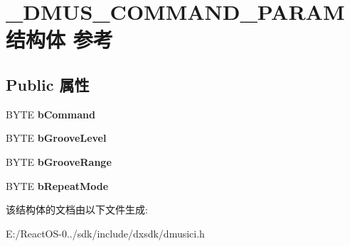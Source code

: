 \hypertarget{struct___d_m_u_s___c_o_m_m_a_n_d___p_a_r_a_m}{}\section{\+\_\+\+D\+M\+U\+S\+\_\+\+C\+O\+M\+M\+A\+N\+D\+\_\+\+P\+A\+R\+A\+M结构体 参考}
\label{struct___d_m_u_s___c_o_m_m_a_n_d___p_a_r_a_m}
\subsection*{Public 属性}
\begin{DoxyCompactItemize}
\item 
\mbox{\label{struct___d_m_u_s___c_o_m_m_a_n_d___p_a_r_a_m_a2c8ffa2fc37414b8b110d7c9f54c3c97}} 
B\+Y\+TE {\bfseries b\+Command}
\item 
\mbox{\label{struct___d_m_u_s___c_o_m_m_a_n_d___p_a_r_a_m_a9e98a052b4fb2d047c7a479d10733a1a}} 
B\+Y\+TE {\bfseries b\+Groove\+Level}
\item 
\mbox{\label{struct___d_m_u_s___c_o_m_m_a_n_d___p_a_r_a_m_a9695d103f5e3bab7fe805d55f197a645}} 
B\+Y\+TE {\bfseries b\+Groove\+Range}
\item 
\mbox{\label{struct___d_m_u_s___c_o_m_m_a_n_d___p_a_r_a_m_ae4687fe85fee7bcbde3ba76e446848c8}} 
B\+Y\+TE {\bfseries b\+Repeat\+Mode}
\end{DoxyCompactItemize}


该结构体的文档由以下文件生成\+:\begin{DoxyCompactItemize}
\item 
E\+:/\+React\+O\+S-\/0../sdk/include/dxsdk/dmusici.\+h\end{DoxyCompactItemize}
